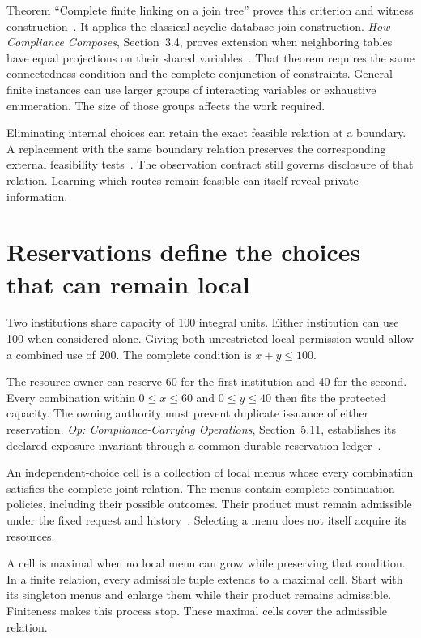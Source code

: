 \documentclass{momentum}
\begin{document}
Theorem ``Complete finite linking on a join tree'' proves this criterion and witness construction~\cite[Section~4.1]{linking}.
It applies the classical acyclic database join construction.
\emph{How Compliance Composes}, Section~3.4, proves extension when neighboring tables have equal projections on their shared variables~\cite{compliance}.
That theorem requires the same connectedness condition and the complete conjunction of constraints.
General finite instances can use larger groups of interacting variables or exhaustive enumeration.
The size of those groups affects the work required.

Eliminating internal choices can retain the exact feasible relation at a boundary.
A replacement with the same boundary relation preserves the corresponding external feasibility tests~\cite[Sections~5--6]{linking}.
The observation contract still governs disclosure of that relation.
Learning which routes remain feasible can itself reveal private information.

\section{Reservations define the choices that can remain local}
\label{sec:reservations}

Two institutions share capacity of 100 integral units.
Either institution can use 100 when considered alone.
Giving both unrestricted local permission would allow a combined use of 200.
The complete condition is $x+y\le100$.

The resource owner can reserve 60 for the first institution and 40 for the second.
Every combination within $0\le x\le60$ and $0\le y\le40$ then fits the protected capacity.
The owning authority must prevent duplicate issuance of either reservation.
\emph{Op: Compliance-Carrying Operations}, Section~5.11, establishes its declared exposure invariant through a common durable reservation ledger~\cite{op}.

An independent-choice cell is a collection of local menus whose every combination satisfies the complete joint relation.
The menus contain complete continuation policies, including their possible outcomes.
Their product must remain admissible under the fixed request and history~\cite[Section~8]{linking}.
Selecting a menu does not itself acquire its resources.

A cell is maximal when no local menu can grow while preserving that condition.
In a finite relation, every admissible tuple extends to a maximal cell.
Start with its singleton menus and enlarge them while their product remains admissible.
Finiteness makes this process stop.
These maximal cells cover the admissible relation.
\end{document}
